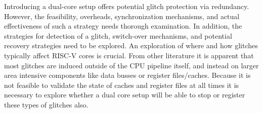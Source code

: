 Introducing a dual-core setup offers potential glitch protection via redundancy. However, the feasibility, overheads, synchronization mechanisms, and actual effectiveness of such a strategy needs thorough examination. In addition, the strategies for detection of a glitch, switch-over mechanisms, and potential recovery strategies need to be explored. An exploration of where and how glitches typically affect RISC-V cores is crucial. From other literature it is apparent that most glitches are induced outside of the CPU pipeline itself, and instead on larger area intensive components like data busses or register files/caches\cite{emfi_injection}. Because it is not feasible to validate the state of caches and register files at all times it is necessary to explore whether a dual core setup will be able to stop or register these types of glitches also. 




